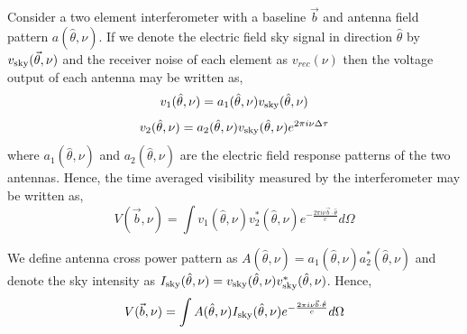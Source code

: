 \documentclass[twocolumn]{emulateapj}
\newcommand{\volt}{{v}}
\newcommand{\vis}{{V}}
\newcommand{\sky}{{\rm sky}}
\newcommand{\bmvolt}{{a}}
\newcommand{\beam}{{A}}
\newcommand{\thhat}{{\hat\theta}}
\newcommand{\ifngexp}{{e^{-\frac{2\pi i\nu\vec{b}\cdot\thhat}{c}}}}
\newcommand{\dfngexp}{{e^{2\pi i\nu \Delta \tau}}}
\begin{document}
Consider a two element interferometer with a baseline $\vec b$ and antenna field pattern $\bmvolt(\thhat, \nu)$. If we denote the electric field sky signal in direction $\thhat$ by $\volt_\sky(\vec \theta, \nu)$ and the receiver noise of each element as $\volt_{rec}(\nu)$ then the voltage output of each antenna may be written as,  
\begin{equation}
\volt_{1}(\thhat, \nu) = \bmvolt_{1}(\thhat,\nu)\volt_\sky(\thhat,\nu)\nonumber\\
\end{equation}
\begin{equation}
\volt_{2} (\thhat, \nu)= \bmvolt_{2}(\thhat,\nu)\volt_\sky(\thhat,\nu)\dfngexp\nonumber\\
\end{equation}
where $\bmvolt_{1}(\thhat,\nu)$ and $\bmvolt_{2}(\thhat,\nu)$ are the electric field response patterns 
of the two antennas.
Hence, the time averaged visibility measured by the interferometer may be written as, 
\begin{equation}
\vis(\vec b, \nu) =  \int  \volt_{1}(\thhat,\nu)  \volt_{2}^{*} (\thhat, \nu) \ifngexp d\Omega 
\label{eq1}
\end{equation}

We define antenna cross power pattern as  $\beam(\thhat,\nu)=\bmvolt_{1}(\thhat,\nu)\bmvolt_{2}^{*}(\thhat,\nu)$ and denote the sky intensity as  $I_\sky(\thhat,\nu)=\volt_\sky(\thhat,\nu)\volt_\sky^{*}(\thhat,\nu)$. Hence, 
\begin{equation}
\vis(\vec b,\nu) = \int \beam(\thhat, \nu) I_\sky(\thhat,\nu) \ifngexp d\Omega
\label{eq2}
\end{equation}
\end{document}
